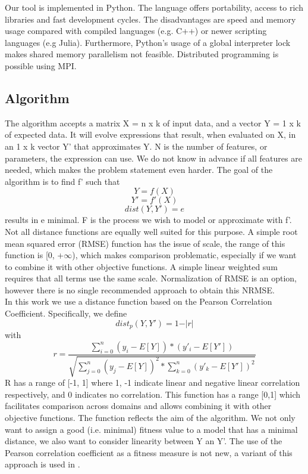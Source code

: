 Our tool is implemented in Python. The language offers portability, access to rich libraries and fast development cycles. The disadvantages are speed and memory usage compared with compiled languages (e.g. C++) or newer scripting languages (e.g Julia).
Furthermore, Python's usage of a global interpreter lock makes shared memory parallelism not feasible. Distributed programming is possible using MPI.
\subsection{Algorithm}
The algorithm accepts a matrix X = n x k of input data, and a vector Y = 1 x k of expected data. It will evolve expressions that result, when evaluated on X, in an 1 x k vector Y' that approximates Y. N is the number of features, or parameters, the expression can use. We do not know in advance if all features are needed, which makes the problem statement even harder.
The goal of the algorithm is to find f' such that
\[Y = f(X)\]
\[Y' = f'(X)\]
\[dist(Y, Y') = e\]
results in e minimal. F is the process we wish to model or approximate with f'.\\
Not all distance functions are equally well suited for this purpose. A simple root mean squared error (RMSE) function has the issue of scale, the range of this function is [0, +$\infty$), which makes comparison problematic, especially if we want to combine it with other objective functions. A simple linear weighted sum requires that all terms use the same scale.
Normalization of RMSE is an option, however there is no single recommended approach to obtain this NRMSE. \\
In this work we use a distance function based on the Pearson Correlation Coefficient. Specifically, we define
\[
dist_p(Y, Y') = 1 - \vert r \vert
\]
with
\[
r = \frac{\sum_{i=0}^{n}{(y_i-E[Y])*(y'_i-E[Y'])}}{\sqrt{\sum_{j=0}^{n}{(y_j-E[Y])^2}*\sum_{k=0}^{n}{(y'_k-E[Y'])^2}}}
\]
R has a range of [-1, 1] where 1, -1 indicate linear and negative linear correlation respectively, and 0 indicates no correlation.
This function has a range [0,1] which facilitates comparison across domains and allows combining it with other objective functions.
The function reflects the aim of the algorithm. We not only want to assign a good (i.e. minimal) fitness value to a model that has a minimal distance, we also want to consider linearity between Y an Y'. The use of the Pearson correlation coefficient as a fitness measure is not new, a variant of this approach is used in \citep{pearson}.
